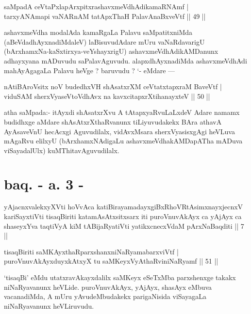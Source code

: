 \begin{shl}
saMpadA ceVtaPxlapArxpitxrashavxmeVdhAdikamaRNAmf |\\
tarxyANAmapi vaNARnAM tatApxThaH PalavAnaBxveVtf \hfill || 49 ||
\end{shl}

\begin{artha}
ashavxmeVdha modalAda kamaRgaLa Palavu saMpatitxniMda (aBeVdadhAyxnadiMdaleV) laBisuvudAdare mUru vaNaRdavarigU (bArxhamxNa-kaSxtirxya-veYshayxrigU) ashavx\-meVdhAdikAMDanunx adhayxyana mADuvudu saPalavAguvudu. alapxdhAyxnadiMda ashavxmeVdhAdi mahAyAgagaLa Palavu heVge ? baruvudu ? `- eMdare ---
\end{artha}

\begin{shl}
nAtiBAroV\s sitx noV budedhxVH shAsatxrXM ceVtatxtapxraM BaveVtf |\\
viduSAM sherxVyaseV\s toV\s dhAvx na kavxcitapxrXtihanayxteV \hfill || 50 ||
\end{shl}

\begin{artha}
atha saMpada:- itAyxdi shAsatxrXvu A tAtapxyaRvuLaLxdeV Adare namamx budidhxge \break aMdare shAsAtxrXthaRvanunx tiLiyuvudakekx BAra athavA AyAsaveVnU hecAcxgi Agu\-vudilalx, vidAvxMsara sherxVyasisxgAgi heVLuva mAgaRvu elilxyU (bArxhamxNAdigaLu ashavxmeVdhakAMDapATha mADuva viSayadalUlx) kuMThitavAguvudilalx.
\end{artha}

\section*{baq. - a. 3 -}

\begin{shl}
yAjacnxvalekxyXVti hoVvAca katiBirayamadayxgiBxRhoVRtAsimxnayxjecnxV kariSayxtiVti tisaqBiriti katamAsAtxsitxsarx iti puroVnuvAkAyx ca yAjAyx ca shaseyxYva taqtiVyA kiM tABijaRyatiVti yatikxcnecxVdaM pArxNaBaqditi || 7 ||
\end{shl}


\begin{shl}
tisaqBiriti saMKAyxthaRparxshanxniNaRyamabarxviVtf |\\
puroVnuvAkAyxduyxkAtxyX tu saMKeyxVyAthaRviniNaRyamf \hfill || 51 ||
\end{shl}

\begin{artha}
`tisaqBi' eMdu utatxravAkayxdalilx saMKeyx eSeTxMba parxshenxge takakx niNaRyavanunx heVLide. puroVnuvAkAyx, yAjAyx, shasAyx eMbuva vacanadiMda, A mUru yAvudeMbudakekx parigaNisida viSayagaLa niNaRyavanunx heVLiruvudu.
\end{artha}

